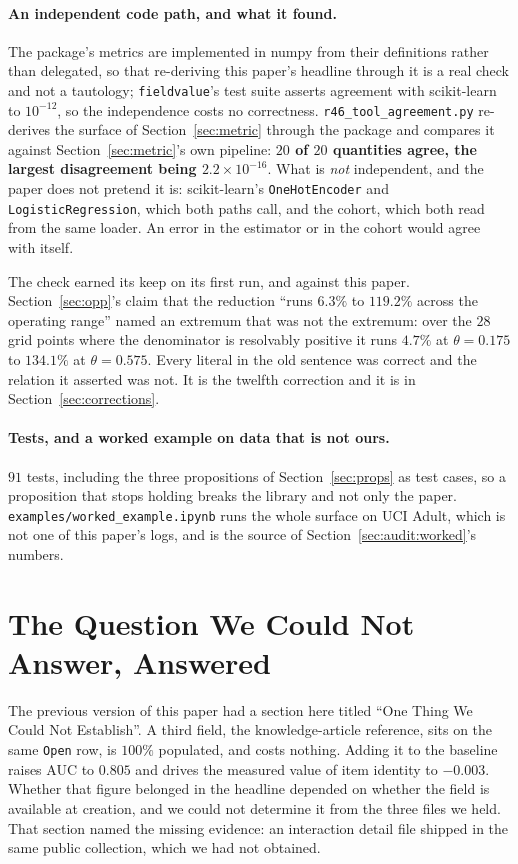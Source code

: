 \documentclass[preprint,12pt]{elsarticle}
\begin{document}
\paragraph{An independent code path, and what it found.} The package's metrics
are implemented in numpy from their definitions rather than delegated, so that
re-deriving this paper's headline through it is a real check and not a
tautology; \texttt{fieldvalue}'s test suite asserts agreement with
scikit-learn to $10^{-12}$, so the independence costs no correctness.
\texttt{r46\_tool\_agreement.py} re-derives the surface of
Section~\ref{sec:metric} through the package and compares it against
Section~\ref{sec:metric}'s own pipeline: \textbf{$20$ of $20$ quantities agree,
the largest disagreement being $2.2 \times 10^{-16}$}. What is \emph{not}
independent, and the paper does not pretend it is: scikit-learn's
\texttt{OneHotEncoder} and \texttt{LogisticRegression}, which both paths call,
and the cohort, which both read from the same loader. An error in the
estimator or in the cohort would agree with itself.

The check earned its keep on its first run, and against this paper.
Section~\ref{sec:opp}'s claim that the reduction ``runs $6.3\%$ to $119.2\%$
across the operating range'' named an extremum that was not the extremum: over
the $28$ grid points where the denominator is resolvably positive it runs
$4.7\%$ at $\theta = 0.175$ to $134.1\%$ at $\theta = 0.575$. Every literal in
the old sentence was correct and the relation it asserted was not. It is the
twelfth correction and it is in Section~\ref{sec:corrections}.

\paragraph{Tests, and a worked example on data that is not ours.}
$91$ tests, including the three propositions of Section~\ref{sec:props} as
test cases, so a proposition that stops holding breaks the library and not
only the paper. \texttt{examples/worked\_example.ipynb} runs the whole surface
on UCI Adult, which is not one of this paper's logs, and is the source of
Section~\ref{sec:audit:worked}'s numbers.

\section{The Question We Could Not Answer, Answered}
\label{sec:failed}

The previous version of this paper had a section here titled ``One Thing We
Could Not Establish''. A third field, the knowledge-article reference, sits on
the same \texttt{Open} row, is $100\%$ populated, and costs nothing. Adding it
to the baseline raises AUC to $0.805$ and drives the measured value of item
identity to $-0.003$. Whether that figure belonged in the headline depended on
whether the field is available at creation, and we could not determine it from
the three files we held. That section named the missing evidence: an
interaction detail file shipped in the same public collection, which we had not
obtained.
\end{document}
